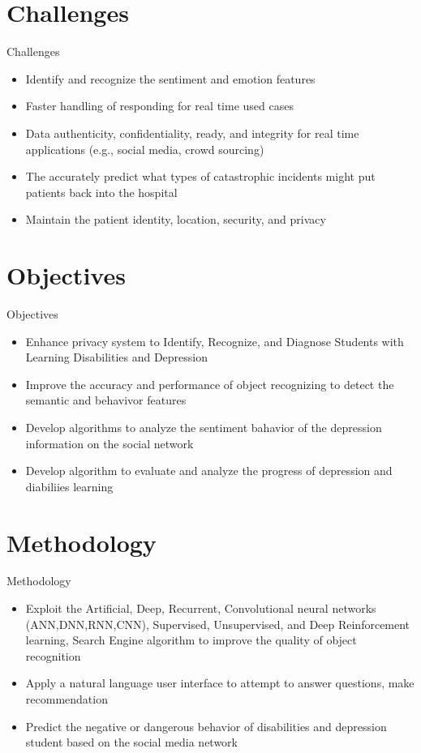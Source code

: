 \documentclass{beamer}
\begin{document}
\section{Challenges}


\begin{frame}{Challenges}
\begin{itemize}
	\item Identify and recognize the sentiment and emotion features
	\item Faster handling of responding for real time used cases
	\item Data authenticity, confidentiality, ready, and integrity for real time applications (e.g., social media, crowd sourcing)
	\item The accurately predict what types of catastrophic incidents might put patients back into the hospital
	\item Maintain the patient identity, location, security, and privacy
	
\end{itemize}
\end{frame}
\section{Objectives}


\begin{frame}{Objectives}
\begin{itemize}
	\item Enhance privacy system to Identify, Recognize, and Diagnose Students with Learning Disabilities and Depression 
	\item Improve the accuracy and performance of object recognizing to detect the semantic and behavivor features 
	\item Develop algorithms to analyze the sentiment bahavior of the depression information on the social network
	\item Develop algorithm to evaluate and analyze the progress of depression and diabiliies learning
	
\end{itemize}
\end{frame}
\section{Methodology}


\begin{frame}{Methodology}
\begin{itemize}
	\item Exploit the Artificial, Deep, Recurrent, Convolutional neural networks (ANN,DNN,RNN,CNN), Supervised, Unsupervised, and Deep Reinforcement learning, Search Engine algorithm to improve the quality of object recognition
	\item Apply a natural language user interface to attempt to answer questions, make recommendation
	\item Predict the negative or dangerous behavior of disabilities and depression student based on the social media network
	
\end{itemize}
\end{frame}
\end{document}
